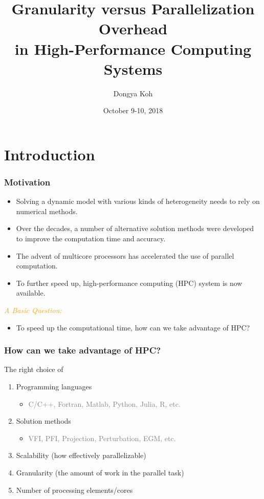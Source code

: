 \documentclass[xcolor=x11names,compress]{beamer}
\renewcommand{\(}{\begin{columns}}
\renewcommand{\)}{\end{columns}}
\newcommand{\<}[1]{\begin{column}{#1}}
\renewcommand{\>}{\end{column}}
\begin{document}
\title{Granularity versus Parallelization Overhead\\ in High-Performance Computing Systems}
\author{Dongya Koh}
\date{October 9-10, 2018}

\begin{frame}
  \titlepage
\end{frame}



\section{Introduction}
\begin{frame}
\frametitle{Motivation}
\begin{itemize}
\item Solving a dynamic model with various kinds of heterogeneity needs to rely on numerical methods.
\item Over the decades, a number of alternative solution methods were developed to improve the computation time and accuracy.
\item The advent of multicore processors has accelerated the use of parallel computation.
\item To further speed up, high-performance computing (HPC) system is now available.
\end{itemize}
\bigskip
\textcolor{orange}{\textit{A Basic Question:}}
\begin{itemize}
\item To speed up the computational time, how can we take advantage of HPC?
\end{itemize}
\end{frame}


\begin{frame}
\frametitle{How can we take advantage of HPC?}
The right choice of
\bigskip
\begin{enumerate}
\item Programming languages
\begin{itemize}
\item[] \textcolor{gray}{C/C++, Fortran, Matlab, Python, Julia, R, etc.}
\smallskip
\end{itemize}
\item Solution methods
\begin{itemize}
\item[] \textcolor{gray}{VFI, PFI, Projection, Perturbation, EGM, etc.}
\smallskip
\end{itemize}
\item Scalability (how effectively parallelizable)
\item Granularity (the amount of work in the parallel task)
\item Number of processing elements/cores
\end{enumerate}
\end{frame}
\end{document}

